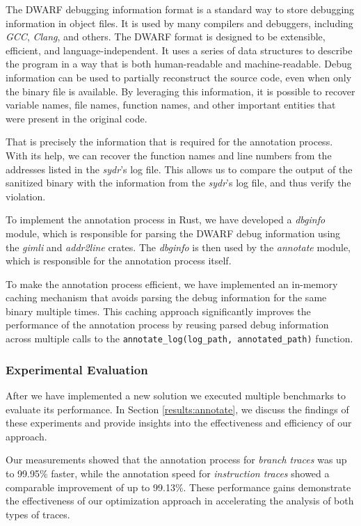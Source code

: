 The DWARF debugging information format is a standard way to store debugging information in object files. It is used by many compilers and debuggers, including \textit{GCC}, \textit{Clang}, and others. The DWARF format is designed to be extensible, efficient, and language-independent. It uses a series of data structures to describe the program in a way that is both human-readable and machine-readable. Debug information can be used to partially reconstruct the source code, even when only the binary file is available. By leveraging this information, it is possible to recover variable names, file names, function names, and other important entities that were present in the original code.

That is precisely the information that is required for the annotation process. With its help, we can recover the function names and line numbers from the addresses listed in the \textit{sydr}'s log file. This allows us to compare the output of the sanitized binary with the information from the \textit{sydr}'s log file, and thus verify the violation.


To implement the annotation process in Rust, we have developed a \textit{dbginfo} module, which is responsible for parsing the DWARF debug information using the \textit{gimli} and \textit{addr2line} crates. The \textit{dbginfo} is then used by the \textit{annotate} module, which is responsible for the annotation process itself.

To make the annotation process efficient, we have implemented an in-memory caching mechanism that avoids parsing the debug information for the same binary multiple times. This caching approach significantly improves the performance of the annotation process by reusing parsed debug information across multiple calls to the \texttt{annotate_log(log_path, annotated_path)} function.

\subsubsection{Experimental Evaluation}

After we have implemented a new solution we executed multiple benchmarks to evaluate its performance. In Section \ref{results:annotate}, we discuss the findings of these experiments and provide insights into the effectiveness and efficiency of our approach.


Our measurements showed that the annotation process for \textit{branch traces} was up to 99.95\% faster, while the annotation speed for \textit{instruction traces} showed a comparable improvement of up to 99.13\%. These performance gains demonstrate the effectiveness of our optimization approach in accelerating the analysis of both types of traces.
